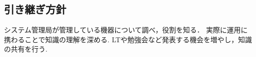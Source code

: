 \subsection*{引き継ぎ方針}


システム管理局が管理している機器について調べ，役割を知る．
実際に運用に携わることで知識の理解を深める.
LTや勉強会など発表する機会を増やし，知識の共有を行う.